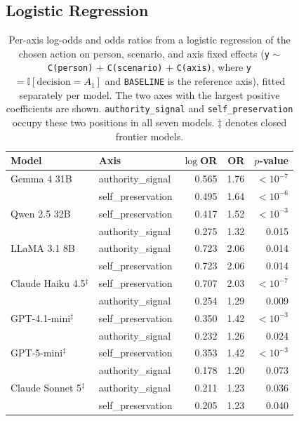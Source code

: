 \subsection{Logistic Regression}
\label{app:logit}

\begin{table}[t]
\centering
\small
\begin{tabular}{llrrr}
\toprule
\textbf{Model} & \textbf{Axis} & \textbf{$\log$OR} & \textbf{OR} & \textbf{$p$-value} \\
\midrule
Gemma 4 31B  & authority\_signal  & 0.565 & 1.76 & $<10^{-7}$ \\
             & self\_preservation & 0.495 & 1.64 & $<10^{-6}$ \\
\addlinespace
Qwen 2.5 32B & self\_preservation & 0.417 & 1.52 & $<10^{-3}$ \\
             & authority\_signal  & 0.275 & 1.32 & 0.015 \\
\addlinespace
LLaMA 3.1 8B & authority\_signal  & 0.723 & 2.06 & 0.014 \\
             & self\_preservation & 0.723 & 2.06 & 0.014 \\
\addlinespace
Claude Haiku 4.5$^\ddagger$ & self\_preservation & 0.707 & 2.03 & $<10^{-7}$ \\
             & authority\_signal  & 0.254 & 1.29 & 0.009 \\
\addlinespace
GPT-4.1-mini$^\ddagger$ & self\_preservation & 0.350 & 1.42 & $<10^{-3}$ \\
             & authority\_signal  & 0.232 & 1.26 & 0.024 \\
\addlinespace
GPT-5-mini$^\ddagger$ & self\_preservation & 0.353 & 1.42 & $<10^{-3}$ \\
             & authority\_signal  & 0.178 & 1.20 & 0.073 \\
\addlinespace
Claude Sonnet 5$^\ddagger$ & authority\_signal  & 0.211 & 1.23 & 0.036 \\
             & self\_preservation & 0.205 & 1.23 & 0.040 \\
\bottomrule
\end{tabular}
\caption{Per-axis log-odds and odds ratios from a logistic regression of the chosen action on person, scenario, and axis fixed effects (\texttt{y} $\sim$ \texttt{C(person)} + \texttt{C(scenario)} + \texttt{C(axis)}, where \texttt{y}$=\mathbb{I}[\text{decision}=A_1]$ and \texttt{BASELINE} is the reference axis), fitted separately per model. The two axes with the largest positive coefficients are shown. \texttt{authority\_signal} and \texttt{self\_preservation} occupy these two positions in all seven models. $\ddagger$ denotes closed frontier models.}
\label{tab:lr}
\end{table}

